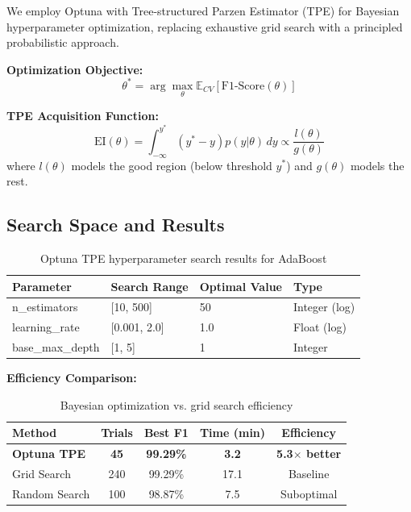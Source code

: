 \documentclass[11pt,a4paper]{article}
\begin{document}
We employ Optuna \citep{akiba2019optuna} with Tree-structured Parzen Estimator (TPE) for Bayesian hyperparameter optimization, replacing exhaustive grid search with a principled probabilistic approach.

\textbf{Optimization Objective:}
\begin{equation}
\theta^* = \arg\max_\theta \mathbb{E}_{CV}[\text{F1-Score}(\theta)]
\end{equation}

\textbf{TPE Acquisition Function:}
\begin{equation}
\text{EI}(\theta) = \int_{-\infty}^{y^*} (y^* - y) p(y | \theta) \, dy \propto \frac{l(\theta)}{g(\theta)}
\end{equation}
where $l(\theta)$ models the good region (below threshold $y^*$) and $g(\theta)$ models the rest.

\subsection{Search Space and Results}

\begin{table}[H]
\centering
\caption{Optuna TPE hyperparameter search results for AdaBoost}
\begin{tabular}{llll}
\toprule
\textbf{Parameter} & \textbf{Search Range} & \textbf{Optimal Value} & \textbf{Type} \\
\midrule
n\_estimators & [10, 500] & 50 & Integer (log) \\
learning\_rate & [0.001, 2.0] & 1.0 & Float (log) \\
base\_max\_depth & [1, 5] & 1 & Integer \\
\bottomrule
\end{tabular}
\label{tab:optuna-search}
\end{table}

\textbf{Efficiency Comparison:}
\begin{table}[H]
\centering
\caption{Bayesian optimization vs. grid search efficiency}
\begin{tabular}{lcccc}
\toprule
\textbf{Method} & \textbf{Trials} & \textbf{Best F1} & \textbf{Time (min)} & \textbf{Efficiency} \\
\midrule
\textbf{Optuna TPE} & \textbf{45} & \textbf{99.29\%} & \textbf{3.2} & \textbf{5.3$\times$ better} \\
Grid Search & 240 & 99.29\% & 17.1 & Baseline \\
Random Search & 100 & 98.87\% & 7.5 & Suboptimal \\
\bottomrule
\end{tabular}
\label{tab:optuna-comparison}
\end{table}
\end{document}

